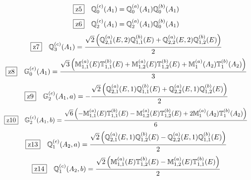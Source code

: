 \documentclass[fleqn,10pt,landscape]{jsarticle}
\begin{document}
\begin{dmath*}
\hspace*{3mm}\fbox{z5}\quad \mathbb{Q}_{0}^{(c)}(A_{1})=\mathbb{Q}_{0}^{(a)}(A_{1}) \mathbb{Q}_{0}^{(b)}(A_{1})
\end{dmath*}
\begin{dmath*}
\hspace*{3mm}\fbox{z6}\quad \mathbb{Q}_{2}^{(c)}(A_{1})=\mathbb{Q}_{2}^{(a)}(A_{1}) \mathbb{Q}_{0}^{(b)}(A_{1})
\end{dmath*}
\begin{dmath*}
\hspace*{3mm}\fbox{z7}\quad \mathbb{Q}_{3}^{(c)}(A_{1})=\frac{\sqrt{2} \left(\mathbb{Q}_{2,1}^{(a)}(E,2) \mathbb{Q}_{1,1}^{(b)}(E) + \mathbb{Q}_{2,2}^{(a)}(E,2) \mathbb{Q}_{1,2}^{(b)}(E)\right)}{2}
\end{dmath*}
\begin{dmath*}
\hspace*{3mm}\fbox{z8}\quad \mathbb{G}_{0}^{(c)}(A_{1})=\frac{\sqrt{3} \left(\mathbb{M}_{1,1}^{(a)}(E) \mathbb{T}_{1,1}^{(b)}(E) + \mathbb{M}_{1,2}^{(a)}(E) \mathbb{T}_{1,2}^{(b)}(E) + \mathbb{M}_{1}^{(a)}(A_{2}) \mathbb{T}_{1}^{(b)}(A_{2})\right)}{3}
\end{dmath*}
\begin{dmath*}
\hspace*{3mm}\fbox{z9}\quad \mathbb{G}_{2}^{(c)}(A_{1},a)=- \frac{\sqrt{2} \left(\mathbb{Q}_{2,1}^{(a)}(E,1) \mathbb{Q}_{1,1}^{(b)}(E) + \mathbb{Q}_{2,2}^{(a)}(E,1) \mathbb{Q}_{1,2}^{(b)}(E)\right)}{2}
\end{dmath*}
\begin{dmath*}
\hspace*{3mm}\fbox{z10}\quad \mathbb{G}_{2}^{(c)}(A_{1},b)=\frac{\sqrt{6} \left(- \mathbb{M}_{1,1}^{(a)}(E) \mathbb{T}_{1,1}^{(b)}(E) - \mathbb{M}_{1,2}^{(a)}(E) \mathbb{T}_{1,2}^{(b)}(E) + 2 \mathbb{M}_{1}^{(a)}(A_{2}) \mathbb{T}_{1}^{(b)}(A_{2})\right)}{6}
\end{dmath*}
\begin{dmath*}
\hspace*{3mm}\fbox{z13}\quad \mathbb{Q}_{1}^{(c)}(A_{2},a)=\frac{\sqrt{2} \left(\mathbb{Q}_{2,1}^{(a)}(E,1) \mathbb{Q}_{1,2}^{(b)}(E) - \mathbb{Q}_{2,2}^{(a)}(E,1) \mathbb{Q}_{1,1}^{(b)}(E)\right)}{2}
\end{dmath*}
\begin{dmath*}
\hspace*{3mm}\fbox{z14}\quad \mathbb{Q}_{1}^{(c)}(A_{2},b)=\frac{\sqrt{2} \left(\mathbb{M}_{1,1}^{(a)}(E) \mathbb{T}_{1,2}^{(b)}(E) - \mathbb{M}_{1,2}^{(a)}(E) \mathbb{T}_{1,1}^{(b)}(E)\right)}{2}
\end{dmath*}
\end{document}
